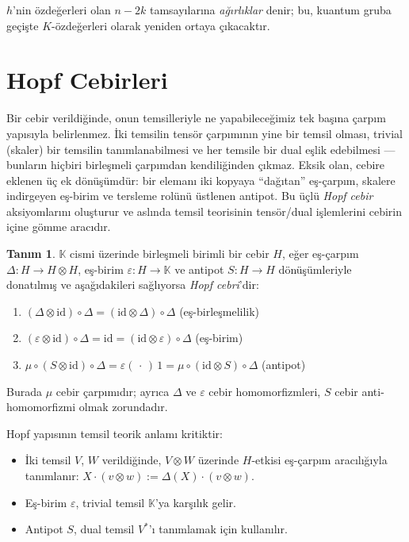 \documentclass[12pt,a4paper,fleqn]{report}
\newcommand{\normalsemi}{;}
\newcommand{\normalsemi}{\begingroup\semicolonfont;\endgroup}
\numberwithin{equation}{chapter}
\theoremstyle{plain}
\theoremstyle{definition}
\newtheorem{definition}[theorem]{Tanım}
\newcommand{\K}{\mathbb{K}}
\newcommand{\id}{\mathrm{id}}
\newcommand{\eps}{\varepsilon}
\newcommand{\cop}{\Delta}
\begin{document}
$h$'nin özdeğerleri olan $n - 2k$ tamsayılarına \emph{ağırlıklar} denir\normalsemi{}
bu, kuantum gruba geçişte $K$-özdeğerleri olarak yeniden ortaya çıkacaktır.

\section{Hopf Cebirleri}

Bir cebir verildiğinde, onun temsilleriyle ne yapabileceğimiz tek başına çarpım
yapısıyla belirlenmez. İki temsilin tensör çarpımının yine bir temsil olması,
trivial (skaler) bir temsilin tanımlanabilmesi ve her temsile bir dual
eşlik edebilmesi --- bunların hiçbiri birleşmeli çarpımdan kendiliğinden çıkmaz.
Eksik olan, cebire eklenen üç ek dönüşümdür: bir elemanı iki kopyaya ``dağıtan''
eş-çarpım, skalere indirgeyen eş-birim ve tersleme rolünü üstlenen antipot. Bu
üçlü \emph{Hopf cebir} aksiyomlarını oluşturur ve aslında temsil teorisinin
tensör/dual işlemlerini cebirin içine gömme aracıdır.

\begin{definition}
$\K$ cismi üzerinde birleşmeli birimli bir cebir $H$, eğer eş-çarpım
$\cop : H \to H \otimes H$, eş-birim $\eps : H \to \K$ ve antipot
$S : H \to H$ dönüşümleriyle donatılmış ve aşağıdakileri sağlıyorsa
\emph{Hopf cebri}'dir:
\begin{enumerate}[leftmargin=*]
  \item $(\cop \otimes \id) \circ \cop = (\id \otimes \cop) \circ \cop$ \quad (eş-birleşmelilik)
  \item $(\eps \otimes \id) \circ \cop = \id = (\id \otimes \eps) \circ \cop$ \quad (eş-birim)
  \item $\mu \circ (S \otimes \id) \circ \cop = \eps(\,\cdot\,)\,1 = \mu \circ (\id \otimes S) \circ \cop$ \quad (antipot)
\end{enumerate}
Burada $\mu$ cebir çarpımıdır\normalsemi{} ayrıca $\cop$ ve $\eps$ cebir homomorfizmleri,
$S$ cebir anti-homomorfizmi olmak zorundadır.
\end{definition}

Hopf yapısının temsil teorik anlamı kritiktir:
\begin{itemize}[leftmargin=*]
  \item İki temsil $V$, $W$ verildiğinde, $V \otimes W$ üzerinde $H$-etkisi
        eş-çarpım aracılığıyla tanımlanır: $X \cdot (v \otimes w) := \cop(X) \cdot (v \otimes w)$.
  \item Eş-birim $\eps$, trivial temsil $\K$'ya karşılık gelir.
  \item Antipot $S$, dual temsil $V^*$'ı tanımlamak için kullanılır.
\end{itemize}
\end{document}
